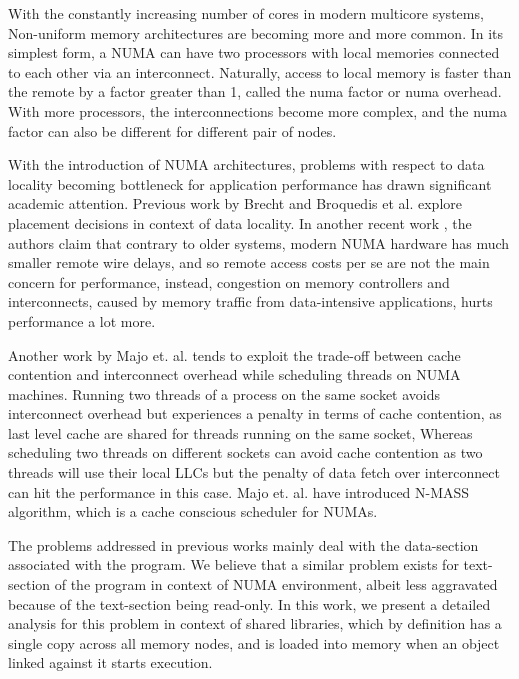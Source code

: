 
With the constantly increasing number of cores in modern multicore systems, Non-uniform memory architectures
are becoming more and more common. In its simplest form, a NUMA can have two processors with local memories connected
to each other via an interconnect. Naturally, access to local memory is faster than the remote by a factor greater than 1,
called the numa factor or numa overhead. With more processors, the interconnections become more complex, and the numa factor
can also be different for different pair of nodes.

With the introduction of NUMA architectures, problems with respect to data locality becoming bottleneck for application performance
has drawn significant academic attention. Previous work by Brecht\cite{Brecht:1993:IPA:1295480.1295481} and 
Broquedis et al.\cite{numaScheduling} explore placement decisions in context of data locality.
In another recent work \cite{Dashti:2013:TMH:2490301.2451157}, the authors claim that contrary to older systems,
modern NUMA hardware has much smaller remote wire delays, and so remote access costs per se are not the main 
concern for performance, instead, congestion on memory controllers and interconnects, caused by memory traffic 
from data-intensive applications, hurts performance a lot more.

Another work by Majo et. al. \cite{Majo:2011:MMN:1993478.1993481} tends to exploit the trade-off between cache contention
and interconnect overhead while scheduling threads on NUMA machines. Running two threads of a process on the same socket
avoids interconnect overhead but experiences a penalty in terms of cache contention, as last level cache are shared for
threads running on the same socket, Whereas scheduling two threads on different sockets can avoid cache contention
as two threads will use their local LLCs but the penalty of data fetch over interconnect can hit the performance in this case.
Majo et. al. \cite{Majo:2011:MMN:1993478.1993481} have introduced N-MASS algorithm, which is a cache conscious scheduler for NUMAs.

The problems addressed in previous works mainly deal with the data-section associated with the program. We believe that
a similar problem exists for text-section of the program in context of NUMA environment, albeit less aggravated
because of the text-section being read-only. In this work, we present a detailed analysis for this problem in context of
shared libraries, which by definition has a single copy across all memory nodes, and is loaded into memory when an object
linked against it starts execution.

